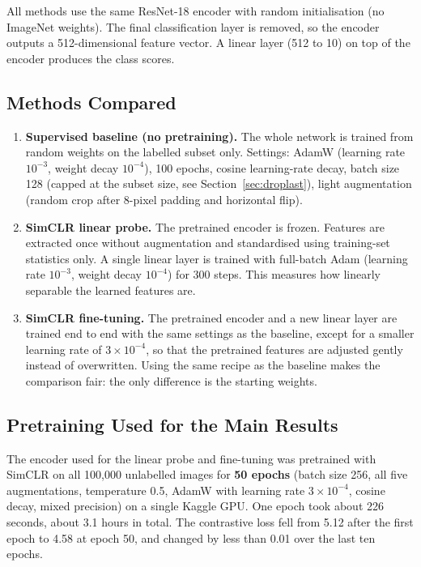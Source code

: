 \documentclass[twoside,a4paper,11pt]{article}
\begin{document}
All methods use the same ResNet-18 encoder with random initialisation (no ImageNet
weights). The final classification layer is removed, so the encoder outputs a
512-dimensional feature vector. A linear layer (512 to 10) on top of the encoder
produces the class scores.

\subsection{Methods Compared}

\begin{enumerate}
  \item \textbf{Supervised baseline (no pretraining).} The whole network is trained from
  random weights on the labelled subset only. Settings: AdamW (learning rate $10^{-3}$,
  weight decay $10^{-4}$), 100 epochs, cosine learning-rate decay, batch size 128
  (capped at the subset size, see Section~\ref{sec:droplast}), light augmentation
  (random crop after 8-pixel padding and horizontal flip).
  \item \textbf{SimCLR linear probe.} The pretrained encoder is frozen. Features are
  extracted once without augmentation and standardised using training-set statistics
  only. A single linear layer is trained with full-batch Adam (learning rate $10^{-3}$,
  weight decay $10^{-4}$) for 300 steps. This measures how linearly separable the
  learned features are.
  \item \textbf{SimCLR fine-tuning.} The pretrained encoder and a new linear layer are
  trained end to end with the same settings as the baseline, except for a smaller
  learning rate of $3\times10^{-4}$, so that the pretrained features are adjusted gently
  instead of overwritten. Using the same recipe as the baseline makes the comparison
  fair: the only difference is the starting weights.
\end{enumerate}

\subsection{Pretraining Used for the Main Results}

The encoder used for the linear probe and fine-tuning was pretrained with SimCLR on all
100,000 unlabelled images for \textbf{50 epochs} (batch size 256, all five
augmentations, temperature 0.5, AdamW with learning rate $3\times10^{-4}$, cosine decay,
mixed precision) on a single Kaggle GPU. One epoch took about 226 seconds, about 3.1
hours in total. The contrastive loss fell from 5.12 after the first epoch to 4.58 at
epoch 50, and changed by less than 0.01 over the last ten epochs.
\end{document}
